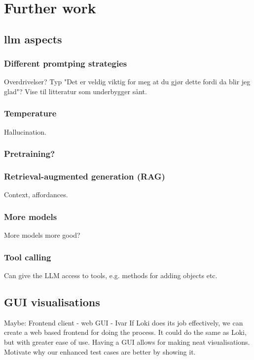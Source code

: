\chapter{Further work}\label{sec:furtherWork}

\section{\acrshort{llm} aspects}

\subsection{Different promtping strategies}

Overdrivelser? Typ "Det er veldig viktig for meg at du gjør dette fordi da blir
jeg glad"? Vise til litteratur som underbygger sånt.

\subsection{Temperature}
Hallucination.

\subsection{Pretraining?}

\subsection{Retrieval-augmented generation (RAG)}
Context, affordances.

\subsection{More models}

More models more good?

\subsection{Tool calling}

Can give the LLM access to tools, e.g. methods for adding objects etc.

\section{GUI visualisations}

Maybe: Frontend client - web GUI - Ivar
If Loki does its job effectively, we can create a web based frontend for doing the process. It could do the same as Loki, but with greater ease of use.
Having a GUI allows for making neat visualisations.
Motivate why our enhanced test cases are better by showing it.

